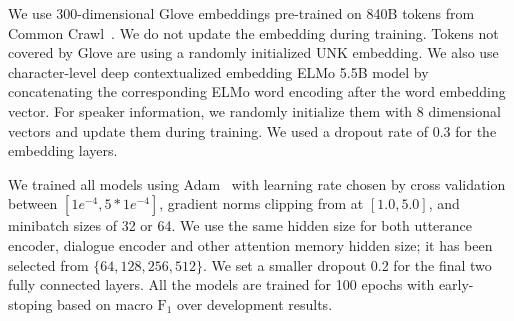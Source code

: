 
We use 300-dimensional Glove embeddings pre-trained on 840B tokens
from Common Crawl~\citep{pennington2014glove}. We do not update the
embedding during training. Tokens not covered by Glove are using a
randomly initialized UNK embedding. We also use character-level deep
contextualized embedding ELMo 5.5B model by concatenating the
corresponding ELMo word encoding after the word embedding
vector. For speaker information, we randomly initialize them with 8
dimensional vectors and update them during training. We used a
dropout rate of 0.3 for the embedding layers.


We trained all models using Adam~\citep{kingma2014adam} with learning
rate chosen by cross validation between $[1e^{-4}, 5*1e^{-4}]$,
gradient norms clipping from at $[1.0, 5.0]$, and minibatch sizes of
32 or 64. We use the same hidden size for both utterance encoder,
dialogue encoder and other attention memory hidden size; it has been
selected from $\{64, 128, 256, 512\}$. We set a smaller dropout 0.2
for the final two fully connected layers. All the models are trained
for 100 epochs with early-stoping based on macro $\text{F}_{1}$ over development
results. 


